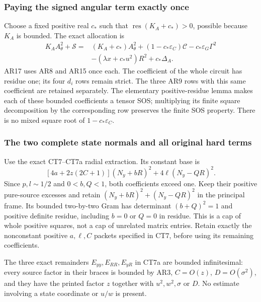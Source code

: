 \subsubsection*{Paying the signed angular term exactly once}

Choose a fixed positive real $c_*$ such that
$\operatorname{res}(K_A+c_*)>0$, possible because $K_A$ is
bounded. The exact allocation is
\[
\begin{split}
 K_AA_\theta^2+\mathscr S
  ={}&(K_A+c_*)A_\theta^2
       +(1-c_*\varepsilon_C)\mathscr C
       -c_*\varepsilon_G\Gamma^2\\
    &-(\lambda x+c_*u^2)R^2+c_*\Delta_A.
\end{split} \tag{AR17}
\]
AR17 uses AR8 and AR15 once each. The coefficient of the whole
circuit has residue one; its four $d_i$ rows remain strict.
The three AR9 rows with this same coefficient are retained
separately. The elementary positive-residue lemma makes each
of these bounded coefficients a tensor SOS; multiplying its
finite square decomposition by the corresponding row preserves
the finite SOS property. There is no mixed square root of
$1-c_*\varepsilon_C$.

\subsubsection*{The two complete state normals and all original hard terms}

Use the exact CT7--CT7a radial extraction. Its constant base is
\[
 [4a+2z(2C+1)](N_y+bR)^2+4\ell(N_y-QR)^2.
 \tag{AR18}
\]
Since $p,l\sim1/2$ and $0<b,Q<1$, both coefficients exceed
one. Keep their positive pure-source excesses and retain
$(N_y+bR)^2+(N_y-QR)^2$ in the principal frame. Its bounded
two-by-two Gram has determinant $(b+Q)^2=1$ and positive
definite residue, including $b=0$ or $Q=0$ in residue. This is
a cap of whole positive squares, not a cap of unrelated matrix
entries. Retain exactly the nonconstant positive $a,\ell,C$
packets specified in CT7, before using its remaining coefficients.

The three exact remainders $E_{yy},E_{RR},E_{yR}$ in CT7a are
bounded infinitesimal: every source factor in their braces is
bounded by AR3, $C=O(z)$, $D=O(\sigma^2)$, and they have the
printed factor $z$ together with $u^2,w^2,\sigma$ or $D$.
No estimate involving a state coordinate or $u/w$ is present.

